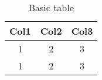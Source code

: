 \documentclass{article}
\begin{document}
\begin{table}[ht]
  \centering
  \caption{Basic table}
  \begin{tabular}{ccc}
    \hline
    Col1 & Col2 & Col3 \\
    \hline
    1 & 2 & 3 \\
    1 & 2 & 3 \\
    \hline
  \end{tabular}
\end{table}
\end{document}
